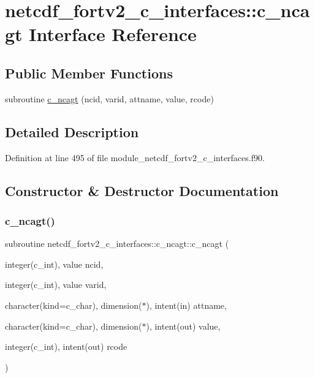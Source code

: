 \hypertarget{interfacenetcdf__fortv2__c__interfaces_1_1c__ncagt}{}\section{netcdf\+\_\+fortv2\+\_\+c\+\_\+interfaces\+:\+:c\+\_\+ncagt Interface Reference}
\label{interfacenetcdf__fortv2__c__interfaces_1_1c__ncagt}
\subsection*{Public Member Functions}
\begin{DoxyCompactItemize}
\item 
subroutine \hyperlink{interfacenetcdf__fortv2__c__interfaces_1_1c__ncagt_ad38e8ee6c08cf7eac83f38f2f2dd9f12}{c\+\_\+ncagt} (ncid, varid, attname, value, rcode)
\end{DoxyCompactItemize}


\subsection{Detailed Description}


Definition at line 495 of file module\+\_\+netcdf\+\_\+fortv2\+\_\+c\+\_\+interfaces.\+f90.



\subsection{Constructor \& Destructor Documentation}
\mbox{\label{interfacenetcdf__fortv2__c__interfaces_1_1c__ncagt_ad38e8ee6c08cf7eac83f38f2f2dd9f12}} 
\subsubsection{\texorpdfstring{c\+\_\+ncagt()}{c\_ncagt()}}
{\footnotesize\ttfamily subroutine netcdf\+\_\+fortv2\+\_\+c\+\_\+interfaces\+::c\+\_\+ncagt\+::c\+\_\+ncagt (\begin{DoxyParamCaption}\item[{integer(c\+\_\+int), value}]{ncid,  }\item[{integer(c\+\_\+int), value}]{varid,  }\item[{character(kind=c\+\_\+char), dimension($\ast$), intent(in)}]{attname,  }\item[{character(kind=c\+\_\+char), dimension($\ast$), intent(out)}]{value,  }\item[{integer(c\+\_\+int), intent(out)}]{rcode }\end{DoxyParamCaption})}



